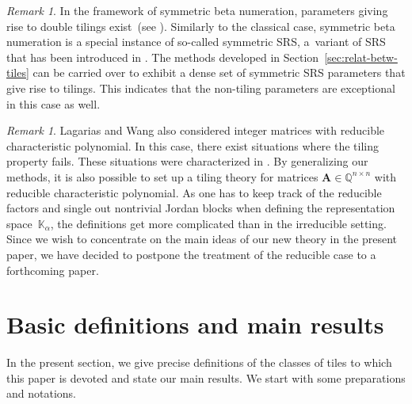 \documentclass[12pt]{amsart}
\theoremstyle{definition}
\theoremstyle{remark}
\newtheorem{remark}[lemma]{Remark}
\numberwithin{equation}{section}
\begin{document}
\begin{remark}
In the framework of symmetric beta numeration, parameters giving rise to double tilings exist~(see \cite{Kalle-Steiner:12}).
Similarly to the classical case, symmetric beta numeration is a special instance of so-called symmetric SRS,
a~variant of SRS that has been introduced in \cite{Akiyama-Scheicher:07}.
The methods developed in Section~\ref{sec:relat-betw-tiles} can be carried over to exhibit a dense set of symmetric SRS parameters that give rise to tilings.
This indicates that the non-tiling parameters are exceptional in this case as well.
\end{remark}

\begin{remark}
Lagarias and Wang also considered integer matrices with reducible characteristic polynomial.
In this case, there exist situations where the tiling property fails.
These situations were characterized in \cite{Lagarias-Wang:97}.
By generalizing our methods, it is also possible to set up a tiling theory for matrices $\mathbf{A}\in\mathbb{Q}^{n\times n}$ with reducible characteristic polynomial.
As one has to keep track of the reducible factors and single out nontrivial Jordan blocks when defining the representation space~$\mathbb{K}_\alpha$, the definitions get more complicated than in the irreducible setting.
Since we wish to concentrate on the main ideas of our new theory in the present paper, we have decided to postpone the treatment of the reducible case to a forthcoming paper.
\end{remark}

\section{Basic definitions and main results} \label{sec:basic-defin-main}

In the present section, we give precise definitions of the classes of tiles to which this paper is devoted and state our main results. We start with some preparations and notations.
\end{document}
